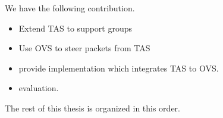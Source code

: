 We have the following contribution.
\begin{itemize}
    \item Extend TAS to support groups
    \item Use OVS to steer packets from TAS
    \item provide implementation which integrates TAS to OVS.
    \item evaluation.
\end{itemize}

The rest of this thesis is organized in this order.




